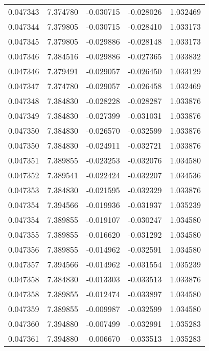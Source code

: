 \begin{tabular}{lrrrr}
0.047343    &  7.374780 & -0.030715 & -0.028026 &             1.032469 \\
0.047344    &  7.379805 & -0.030715 & -0.028410 &             1.033173 \\
0.047345    &  7.379805 & -0.029886 & -0.028148 &             1.033173 \\
0.047346    &  7.384516 & -0.029886 & -0.027365 &             1.033832 \\
0.047346    &  7.379491 & -0.029057 & -0.026450 &             1.033129 \\
0.047347    &  7.374780 & -0.029057 & -0.026458 &             1.032469 \\
0.047348    &  7.384830 & -0.028228 & -0.028287 &             1.033876 \\
0.047349    &  7.384830 & -0.027399 & -0.031031 &             1.033876 \\
0.047350    &  7.384830 & -0.026570 & -0.032599 &             1.033876 \\
0.047350    &  7.384830 & -0.024911 & -0.032721 &             1.033876 \\
0.047351    &  7.389855 & -0.023253 & -0.032076 &             1.034580 \\
0.047352    &  7.389541 & -0.022424 & -0.032207 &             1.034536 \\
0.047353    &  7.384830 & -0.021595 & -0.032329 &             1.033876 \\
0.047354    &  7.394566 & -0.019936 & -0.031937 &             1.035239 \\
0.047354    &  7.389855 & -0.019107 & -0.030247 &             1.034580 \\
0.047355    &  7.389855 & -0.016620 & -0.031292 &             1.034580 \\
0.047356    &  7.389855 & -0.014962 & -0.032591 &             1.034580 \\
0.047357    &  7.394566 & -0.014962 & -0.031554 &             1.035239 \\
0.047358    &  7.384830 & -0.013303 & -0.033513 &             1.033876 \\
0.047358    &  7.389855 & -0.012474 & -0.033897 &             1.034580 \\
0.047359    &  7.389855 & -0.009987 & -0.032599 &             1.034580 \\
0.047360    &  7.394880 & -0.007499 & -0.032991 &             1.035283 \\
0.047361    &  7.394880 & -0.006670 & -0.033513 &             1.035283 \\

\end{tabular}
